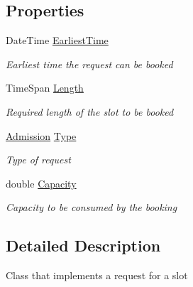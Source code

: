\subsection*{Properties}
\begin{DoxyCompactItemize}
\item 
Date\+Time \hyperlink{class_general_health_care_elements_1_1_booking_models_1_1_slot_request_aeb35570bf9da9877e7dd513d84097df1}{Earliest\+Time}
\begin{DoxyCompactList}\small\item\em Earliest time the request can be booked \end{DoxyCompactList}\item 
Time\+Span \hyperlink{class_general_health_care_elements_1_1_booking_models_1_1_slot_request_a33de7d58c6e6759c5031e63472f9e7a7}{Length}
\begin{DoxyCompactList}\small\item\em Required length of the slot to be booked \end{DoxyCompactList}\item 
\hyperlink{class_general_health_care_elements_1_1_treatment_admission_types_1_1_admission}{Admission} \hyperlink{class_general_health_care_elements_1_1_booking_models_1_1_slot_request_ae6f718021172416e83368ed159c5f449}{Type}
\begin{DoxyCompactList}\small\item\em Type of request \end{DoxyCompactList}\item 
double \hyperlink{class_general_health_care_elements_1_1_booking_models_1_1_slot_request_ac8977479089d801cdd7407ea8da88ab8}{Capacity}
\begin{DoxyCompactList}\small\item\em Capacity to be consumed by the booking \end{DoxyCompactList}\end{DoxyCompactItemize}


\subsection{Detailed Description}
Class that implements a request for a slot 



